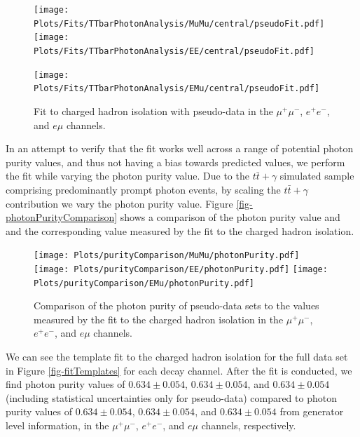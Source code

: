 \begin{figure}
\texttt{[image: Plots/Fits/TTbarPhotonAnalysis/MuMu/central/pseudoFit.pdf]}
\texttt{[image: Plots/Fits/TTbarPhotonAnalysis/EE/central/pseudoFit.pdf]}\\
\begin{center}
\texttt{[image: Plots/Fits/TTbarPhotonAnalysis/EMu/central/pseudoFit.pdf]}
\end{center}
\caption{Fit to charged hadron isolation with pseudo-data in the $\mu^{+}\mu^{-}$, $e^{+}e^{-}$, and $e\mu$ channels.}
\label{fig-pseudofit}
\end{figure}

In an attempt to verify that the fit works well across a range of potential photon purity values, and thus not having a bias towards predicted values, we perform the fit while varying the photon purity value. Due to the $t\bar{t}+\gamma$ simulated sample comprising predominantly prompt photon events, by scaling the $t\bar{t}+\gamma$ contribution we vary the photon purity value. Figure \ref{fig-photonPurityComparison} shows a comparison of the photon purity value and and the corresponding value measured by the fit to the charged hadron isolation. 


\begin{figure}
\texttt{[image: Plots/purityComparison/MuMu/photonPurity.pdf]}
\texttt{[image: Plots/purityComparison/EE/photonPurity.pdf]}
\texttt{[image: Plots/purityComparison/EMu/photonPurity.pdf]}
\caption{Comparison of the photon purity of pseudo-data sets to the values measured by the fit to the charged hadron isolation in the $\mu^{+}\mu^{-}$, $e^{+}e^{-}$, and $e\mu$ channels.}
\label{fig-photonPuritiyComparison}
\end{figure}

We can see the template fit to the charged hadron isolation for the full data set in Figure \ref{fig-fitTemplates} for each decay channel. After the fit is conducted, we find photon purity values of $0.634 \pm 0.054$, $0.634 \pm 0.054$, and $0.634 \pm 0.054$ (including statistical uncertainties only for pseudo-data) compared to photon purity values of $0.634 \pm 0.054$, $0.634 \pm 0.054$, and $0.634 \pm 0.054$ from generator level information, in the $\mu^{+}\mu^{-}$, $e^{+}e^{-}$, and $e\mu$ channels, respectively. 


